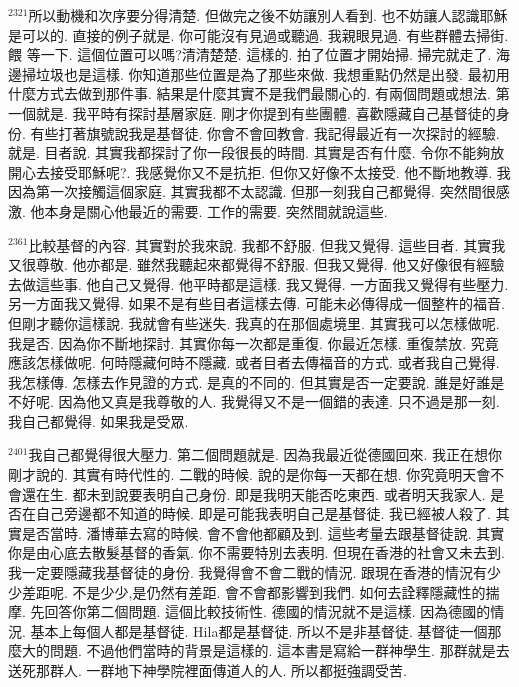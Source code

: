 \documentclass{book}
\begin{document}
$^{2321}$所以動機和次序要分得清楚.
但做完之後不妨讓別人看到.
也不妨讓人認識耶穌是可以的.
直接的例子就是.
你可能沒有見過或聽過.
我親眼見過.
有些群體去掃街.
餵 等一下.
這個位置可以嗎?清清楚楚.
這樣的.
拍了位置才開始掃.
掃完就走了.
海邊掃垃圾也是這樣.
你知道那些位置是為了那些來做.
我想重點仍然是出發.
最初用什麼方式去做到那件事.
結果是什麼其實不是我們最關心的.
有兩個問題或想法.
第一個就是.
我平時有探討基層家庭.
剛才你提到有些團體.
喜歡隱藏自己基督徒的身份.
有些打著旗號說我是基督徒.
你會不會回教會.
我記得最近有一次探討的經驗.
就是.
目者說.
其實我都探討了你一段很長的時間.
其實是否有什麼.
令你不能夠放開心去接受耶穌呢?.
我感覺你又不是抗拒.
但你又好像不太接受.
他不斷地教導.
我因為第一次接觸這個家庭.
其實我都不太認識.
但那一刻我自己都覺得.
突然間很感激.
他本身是關心他最近的需要.
工作的需要.
突然間就說這些.

$^{2361}$比較基督的內容.
其實對於我來說.
我都不舒服.
但我又覺得.
這些目者.
其實我又很尊敬.
他亦都是.
雖然我聽起來都覺得不舒服.
但我又覺得.
他又好像很有經驗去做這些事.
他自己又覺得.
他平時都是這樣.
我又覺得.
一方面我又覺得有些壓力.
另一方面我又覺得.
如果不是有些目者這樣去傳.
可能未必傳得成一個整杵的福音.
但剛才聽你這樣說.
我就會有些迷失.
我真的在那個處境里.
其實我可以怎樣做呢.
我是否.
因為你不斷地探討.
其實你每一次都是重復.
你最近怎樣.
重復禁放.
究竟應該怎樣做呢.
何時隱藏何時不隱藏.
或者目者去傳福音的方式.
或者我自己覺得.
我怎樣傳.
怎樣去作見證的方式.
是真的不同的.
但其實是否一定要說.
誰是好誰是不好呢.
因為他又真是我尊敬的人.
我覺得又不是一個錯的表達.
只不過是那一刻.
我自己都覺得.
如果我是受眾.

$^{2401}$我自己都覺得很大壓力.
第二個問題就是.
因為我最近從德國回來.
我正在想你剛才說的.
其實有時代性的.
二戰的時候.
說的是你每一天都在想.
你究竟明天會不會還在生.
都未到說要表明自己身份.
即是我明天能否吃東西.
或者明天我家人.
是否在自己旁邊都不知道的時候.
即是可能我表明自己是基督徒.
我已經被人殺了.
其實是否當時.
潘博華去寫的時候.
會不會他都顧及到.
這些考量去跟基督徒說.
其實你是由心底去散髮基督的香氣.
你不需要特別去表明.
但現在香港的社會又未去到.
我一定要隱藏我基督徒的身份.
我覺得會不會二戰的情況.
跟現在香港的情況有少少差距呢.
不是少少,是仍然有差距.
會不會都影響到我們.
如何去詮釋隱藏性的揣摩.
先回答你第二個問題.
這個比較技術性.
德國的情況就不是這樣.
因為德國的情況.
基本上每個人都是基督徒.
Hila都是基督徒.
所以不是非基督徒.
基督徒一個那麼大的問題.
不過他們當時的背景是這樣的.
這本書是寫給一群神學生.
那群就是去送死那群人.
一群地下神學院裡面傳道人的人.
所以都挺強調受苦.
\end{document}
